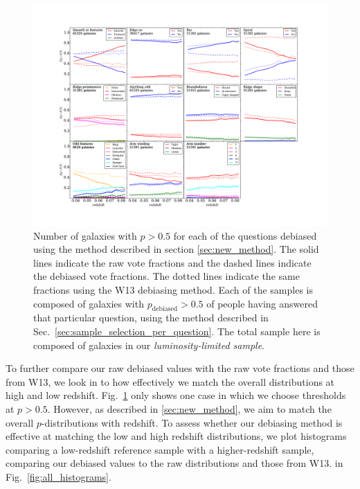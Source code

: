 \documentclass[useAMS,usenatbib]{mn2e}
\begin{document}
\begin{figure}
		\centering

        \includegraphics[width=1\textwidth]{Images/Bias/Debiasing/all_thresholds.pdf}

        \caption{Number of galaxies with $p>0.5$ for each of the questions debiased using the method described in section \ref{sec:new_method}. The solid lines indicate the raw vote fractions and the dashed lines indicate the debiased vote fractions. The dotted lines indicate the same fractions using the W13 debiasing method. Each of the samples is composed of galaxies with $p_{\textrm{debiased}}>0.5$ of people having answered that particular question, using the method described in Sec.~\ref{sec:sample_selection_per_question}. The total sample here is composed of galaxies in our \textit{luminosity-limited sample}.}

        \label{fig:all_thresholds}

\end{figure}

To further compare our raw debiased values with the raw vote fractions and those from W13, we look in to how effectively we match the overall distributions at high and low redshift. Fig.~\ref{fig:all_thresholds} only shows one case in which we choose thresholds at $p>0.5$. However, as described in \ref{sec:new_method}, we aim to match the overall $p$-distributions with redshift. To assess whether our debiasing method is effective at matching the low and high redshift distributions, we plot histograms comparing a low-redshift reference sample with a higher-redshift sample, comparing our debiased values to the raw distributions and those from W13. in Fig.~\ref{fig:all_histograms}.
\end{document}
